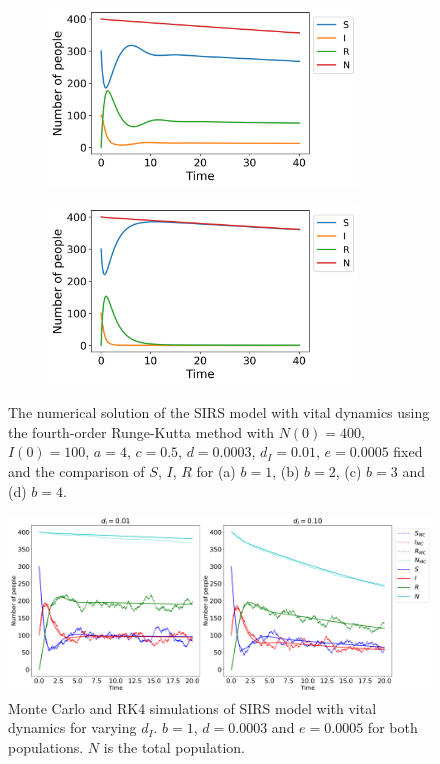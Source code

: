 \documentclass[../main.tex]{subfiles}
\begin{document}
\begin{figure}[htb!]
    \begin{subfigure}[b]{0.475\textwidth}
    \centering
    \includegraphics[width=0.9\textwidth]{../figures/SIRS_vital_rk4_b=3.png}
    \caption{}
    \label{fig:vital_b=3}
    \end{subfigure}
    \quad
    \begin{subfigure}[b]{0.475\textwidth}
    \includegraphics[width=0.9\textwidth]{../figures/SIRS_vital_rk4_b=4.png}
    \caption{}
    \label{fig:vital_b=4}
    \end{subfigure}
    \caption{The numerical solution of the SIRS model with vital dynamics using the fourth-order Runge-Kutta method with $N(0)=400$, $I(0)=100$, $a=4$, $c=0.5$, $d=0.0003$, $d_I=0.01$, $e=0.0005$ fixed and the comparison of $S$, $I$, $R$ for (a)  $b=1$, (b) $b=2$, (c) $b=3$ and (d) $b=4$.}
    \label{fig:SIRS_rk4_vital}
\end{figure}
\fi


\begin{figure}[!htb]
\centering
\includegraphics[width=\textwidth]{../figures/rk4_vs_mc_vd.pdf}
\caption{Monte Carlo and RK4 simulations of SIRS model with vital dynamics for varying $d_I$. $b = 1$, $d = 0.0003$ and $e = 0.0005$ for both populations. $N$ is the total population.}
\label{fig:mc:vital}
\end{figure}
\end{document}
